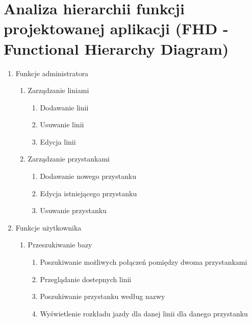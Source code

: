 \section{Analiza hierarchii funkcji projektowanej aplikacji (FHD - Functional Hierarchy
Diagram)}
\renewcommand{\labelenumii}{\arabic{enumi}.\arabic{enumii}.}
\renewcommand{\labelenumiii}{\arabic{enumi}.\arabic{enumii}.\arabic{enumiii}.}

\begin{enumerate}
    \item Funkcje administratora
    \begin{enumerate}
        \item Zarządzanie liniami
                \begin{enumerate}
                    \item Dodawanie linii
                    \item Usuwanie linii
                    \item Edycja linii
                \end{enumerate}
        \item Zarządzanie przystankami
                \begin{enumerate}
                    \item Dodawanie nowego przystanku
                    \item Edycja istniejącego przystanku
                    \item Usuwanie przystanku
                \end{enumerate}
    \end{enumerate}

    \item Funkcje użytkownika
     \begin{enumerate}
        \item Przeszukiwanie bazy
            \begin{enumerate}
                \item Poszukiwanie możliwych połączeń pomiędzy dwoma przystankami
                \item Przeglądanie dostepnych linii
                \item Poszukiwanie przystanku według nazwy
                \item Wyświetlenie rozkładu jazdy dla danej linii dla danego przystanku
            \end{enumerate}

     \end{enumerate}

\end{enumerate}




